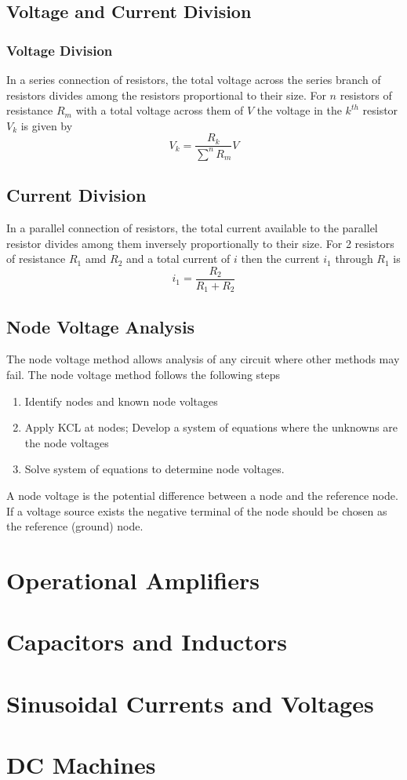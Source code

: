 \documentclass[14pt]{article}
\begin{document}
    \subsection{Voltage and Current Division}
    \subsubsection{Voltage Division}
    In a series connection of resistors, the total voltage across the
    series branch of resistors divides among the resistors proportional
    to their size. For $n$ resistors of resistance $R_m$ with a total
    voltage across them of $V$ the voltage in the $k^{th}$ resistor
    $V_k$ is given by
    $$V_k=\frac{R_k}{\sum\limits^nR_m}V$$
    \subsection{Current Division}
    In a parallel connection of resistors, the total current available
    to the parallel resistor divides among them inversely proportionally
    to their size. For 2 resistors of resistance $R_1$ amd $R_2$ and a
    total current of $i$ then the current $i_1$ through $R_1$ is
    $$i_1=\frac{R_2}{R_1+R_2}$$
    \subsection{Node Voltage Analysis}
    The node voltage method allows analysis of any circuit where other
    methods may fail. The node voltage method follows the following
    steps
    \begin{enumerate}
        \item Identify nodes and known node voltages
        \item Apply KCL at nodes; Develop a system of equations where
        the unknowns are the node voltages
        \item Solve system of equations to determine node voltages.
    \end{enumerate}
    A node voltage is the potential difference between a node and the
    reference node. If a voltage source exists the negative terminal of
    the node should be chosen as the reference (ground) node. 
    \section{Operational Amplifiers}
    \section{Capacitors and Inductors}
    \section{Sinusoidal Currents and Voltages}
    \section{DC Machines}  
\end{document}
